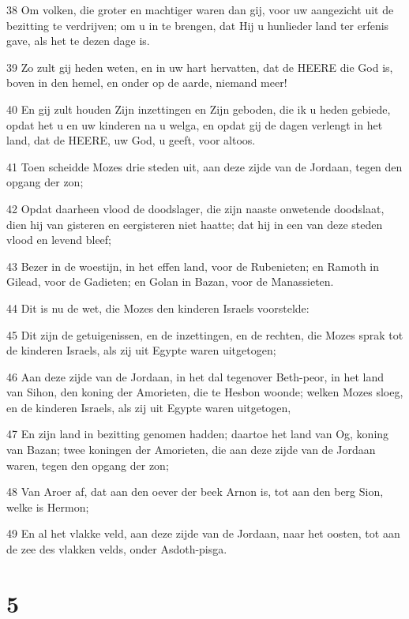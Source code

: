 \par 38 Om volken, die groter en machtiger waren dan gij, voor uw aangezicht uit de bezitting te verdrijven; om u in te brengen, dat Hij u hunlieder land ter erfenis gave, als het te dezen dage is.
\par 39 Zo zult gij heden weten, en in uw hart hervatten, dat de HEERE die God is, boven in den hemel, en onder op de aarde, niemand meer!
\par 40 En gij zult houden Zijn inzettingen en Zijn geboden, die ik u heden gebiede, opdat het u en uw kinderen na u welga, en opdat gij de dagen verlengt in het land, dat de HEERE, uw God, u geeft, voor altoos.
\par 41 Toen scheidde Mozes drie steden uit, aan deze zijde van de Jordaan, tegen den opgang der zon;
\par 42 Opdat daarheen vlood de doodslager, die zijn naaste onwetende doodslaat, dien hij van gisteren en eergisteren niet haatte; dat hij in een van deze steden vlood en levend bleef;
\par 43 Bezer in de woestijn, in het effen land, voor de Rubenieten; en Ramoth in Gilead, voor de Gadieten; en Golan in Bazan, voor de Manassieten.
\par 44 Dit is nu de wet, die Mozes den kinderen Israels voorstelde:
\par 45 Dit zijn de getuigenissen, en de inzettingen, en de rechten, die Mozes sprak tot de kinderen Israels, als zij uit Egypte waren uitgetogen;
\par 46 Aan deze zijde van de Jordaan, in het dal tegenover Beth-peor, in het land van Sihon, den koning der Amorieten, die te Hesbon woonde; welken Mozes sloeg, en de kinderen Israels, als zij uit Egypte waren uitgetogen,
\par 47 En zijn land in bezitting genomen hadden; daartoe het land van Og, koning van Bazan; twee koningen der Amorieten, die aan deze zijde van de Jordaan waren, tegen den opgang der zon;
\par 48 Van Aroer af, dat aan den oever der beek Arnon is, tot aan den berg Sion, welke is Hermon;
\par 49 En al het vlakke veld, aan deze zijde van de Jordaan, naar het oosten, tot aan de zee des vlakken velds, onder Asdoth-pisga.

\chapter{5}

